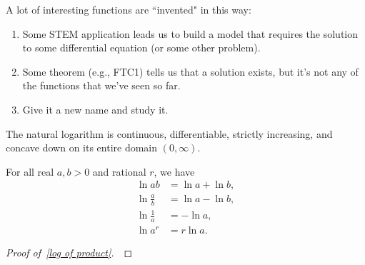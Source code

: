 \begin{remark}
A lot of interesting functions are ``invented" in this way:
\begin{enumerate}
\item Some STEM application leads us to build a model that requires the solution to some differential equation (or some other problem).
\item Some theorem (e.g., FTC1) tells us that a solution exists, but it's not any of the functions that we've seen so far.
\item Give it a new name and study it.
\end{enumerate}
\end{remark}

\begin{corollary}
The natural logarithm is continuous, differentiable, strictly increasing, and concave down on its entire domain $(0,\infty)$.
\end{corollary}

\newpage 

\begin{theorem}
For all real $a,b>0$ and rational $r$, we have
\begin{align}
 \ln ab &= \ln a + \ln b,\label{log of product}\\
 \ln\frac{a}{b} &= \ln a - \ln b,\\
 \ln\frac{1}{a} &= -\ln a,\\
 \ln a^r &= r\ln a.
\end{align}
\end{theorem}
\ifdefined\SOLUTION
{}
\else
\begin{proof}[Proof of~\eqref{log of product}]\,

\vspace{6in}
\end{proof}
\fi

